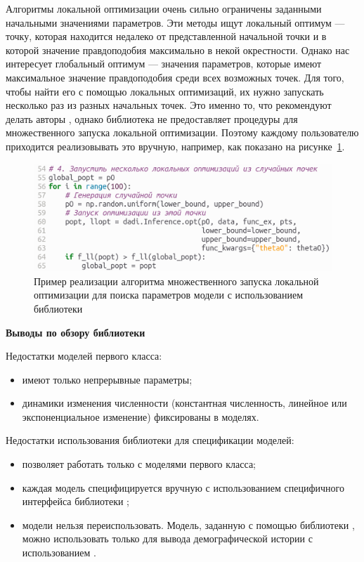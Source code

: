 \documentclass[a4paper,14pt,oneside,openany,article]{memoir}
\begin{document}
Алгоритмы локальной оптимизации очень сильно ограничены заданными начальными значениями параметров.
Эти методы ищут локальный оптимум --- точку, которая находится недалеко от представленной начальной точки и в которой значение правдоподобия максимально в некой окрестности.
Однако нас интересует глобальный оптимум --- значения параметров, которые имеют максимальное значение правдоподобия среди всех возможных точек.
Для того, чтобы найти его с помощью локальных оптимизаций, их нужно запускать несколько раз из разных начальных точек.
Это именно то, что рекомендуют делать авторы \dadi, однако библиотека не предоставляет процедуры для множественного запуска локальной оптимизации.
Поэтому каждому пользователю приходится реализовывать это вручную, например, как показано на рисунке~\ref{fig:dadi:ls_run_several}.
\begin{figure}[h]
    \centering
    \includegraphics[width=0.6\linewidth]{images_2/dadi_ls_multi.png}
    \caption{Пример реализации алгоритма множественного запуска локальной оптимизации для поиска параметров модели с использованием библиотеки \dadi}
    \label{fig:dadi:ls_run_several}
\end{figure}

\textbf{Выводы по обзору библиотеки \dadi}

Недостатки моделей первого класса:
\begin{itemize}
    \item имеют только непрерывные параметры;
    \item динамики изменения численности (константная численность, линейное или экспоненциальное изменение) фиксированы в моделях.\\
\end{itemize}

Недостатки использования библиотеки \dadi для спецификации моделей:
\begin{itemize}
    \item позволяет работать только с моделями первого класса;
    \item каждая модель специфицируется вручную с использованием специфичного интерфейса библиотеки \dadi;
    \item модели нельзя переиспользовать. Модель, заданную с помощью библиотеки \dadi, можно использовать только для вывода демографической истории с использованием \dadi.
\end{itemize}
\end{document}
